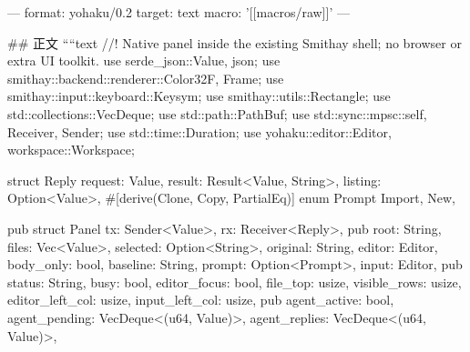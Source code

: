 ---
format: yohaku/0.2
target: text
macro: '[[macros/raw]]'
---

## 正文
````text
//! Native panel inside the existing Smithay shell; no browser or extra UI toolkit.
use serde_json::{Value, json};
use smithay::backend::renderer::{Color32F, Frame};
use smithay::input::keyboard::Keysym;
use smithay::utils::Rectangle;
use std::collections::VecDeque;
use std::path::PathBuf;
use std::sync::mpsc::{self, Receiver, Sender};
use std::time::Duration;
use yohaku::{editor::Editor, workspace::Workspace};

struct Reply {
    request: Value,
    result: Result<Value, String>,
    listing: Option<Value>,
}
#[derive(Clone, Copy, PartialEq)]
enum Prompt {
    Import,
    New,
}

pub struct Panel {
    tx: Sender<Value>,
    rx: Receiver<Reply>,
    pub root: String,
    files: Vec<Value>,
    selected: Option<String>,
    original: String,
    editor: Editor,
    body_only: bool,
    baseline: String,
    prompt: Option<Prompt>,
    input: Editor,
    pub status: String,
    busy: bool,
    editor_focus: bool,
    file_top: usize,
    visible_rows: usize,
    editor_left_col: usize,
    input_left_col: usize,
    pub agent_active: bool,
    agent_pending: VecDeque<(u64, Value)>,
    agent_replies: VecDeque<(u64, Value)>,
}


